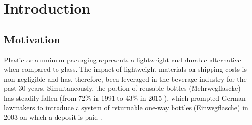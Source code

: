 

\chapter{Introduction}

\section{Motivation}
\label{sec:motivation}
Plastic or aluminum packaging represents a lightweight and durable alternative when compared to glass. The impact of lightweight materials on shipping costs is non-negligible and has, therefore, been leveraged in the beverage industry for the past 30 years. Simultaneously, the portion of reusable bottles (Mehrwegflasche) has steadily fallen (from 72\% in 1991 \cite[p.~1]{BMU2015} to 43\% in 2015 \cite[p.~4]{UBA2017}), which prompted German lawmakers to introduce a system of returnable one-way bottles (Einwegflasche) in 2003 on which a deposit is paid \cite[p.~53]{Geyer/Smoltczyk2003}. 

